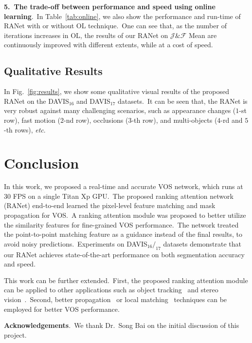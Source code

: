 \documentclass[10pt,twocolumn,letterpaper]{article}
\newcommand{\bigsize}{\fontsize{9.8pt}{10pt}\selectfont}
\begin{document}
\noindent
\textbf{5.\ The trade-off between performance and speed using online learning}.\
In Table~\ref{tab:online}, we also show the performance and run-time of RANet with or without OL technique.\ One can see that, as the number of iterations increases in OL, the results of our RANet on $\mathcal{J}\&\mathcal{F}$ Mean are continuously improved with different extents, while at a cost of speed.







\subsection{Qualitative Results}
\label{sec:visual}
In Fig.~\ref{fig:results}, we show some qualitative visual results of the proposed RANet on the DAVIS$_{16}$ and DAVIS$_{17}$ datasets.\ It can be seen that, the RANet is very robust against many challenging scenarios, such as appearance changes ($1$-st row), fast motion ($2$-nd row), occlusions ($3$-th row), and multi-objects ($4$-rd and $5$-th rows), \textit{etc}.\





\section{Conclusion}

In this work, we proposed a real-time and accurate VOS network, which runs at 30 FPS on a single Titan Xp GPU.\ The proposed ranking attention network (RANet) end-to-end learned the pixel-level feature matching and mask propagation for VOS.\ A ranking attention module was proposed to better utilize the similarity features for fine-grained VOS performance.\ The network treated the point-to-point matching feature as a guidance instead of the final results, to avoid noisy predictions.\ Experiments on DAVIS$_{16}/_{17}$ datasets demonstrate that our RANet achieves state-of-the-art performance on both segmentation accuracy and speed.

This work can be further extended.\ First, the proposed ranking attention module can be applied to other applications such as object tracking~\cite{siammask} and stereo vision~\cite{Khamis2018StereoNet}.\ Second, better propagation~\cite{flownet, flownet2} or local matching~\cite{Voigtlaender2019FEELVOS} techniques can be employed for better VOS performance.

\vspace{2mm}
\noindent
\textbf{Acknowledgements}.\
We thank Dr.\ Song Bai on the initial discussion of this project.


\clearpage
{
\balance
\bigsize

}
\end{document}
